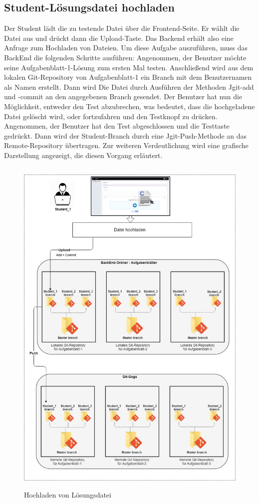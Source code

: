 \documentclass[a4paper,12pt,oneside]{book}
\begin{document}
\subsection{Student-Lösungsdatei hochladen}
Der Student lädt die zu testende Datei über die Frontend-Seite. Er wählt die Datei aus und drückt dann die Upload-Taste. Das Backend erhält also eine Anfrage zum Hochladen von Dateien. Um diese Aufgabe auszuführen, muss das BackEnd die folgenden Schritte ausführen: Angenommen, der Benutzer möchte seine Aufgabenblatt-1-Lösung zum ersten Mal testen. Anschließend wird aus dem lokalen Git-Repository von Aufgabenblatt-1 ein Branch mit dem Benutzernamen als Namen erstellt. Dann wird Die Datei durch Ausführen der Methoden Jgit-add und -commit an den angegebenen Branch gesendet. Der Benutzer hat nun die Möglichkeit, entweder den Test abzubrechen, was bedeutet, dass die hochgeladene Datei gelöscht wird, oder fortzufahren und den Testknopf zu drücken. Angenommen, der Benutzer hat den Test abgeschlossen und die Testtaste gedrückt. Dann wird der Student-Branch durch eine Jgit-Push-Methode an das Remote-Repository übertragen. Zur weiteren Verdeutlichung wird eine grafische Darstellung angezeigt, die diesen Vorgang erläutert.
\begin{figure}[h!]
	\begin{center}
		\includegraphics[width=14cm, height=17cm]{Loesungupload.jpg}
		\caption{Hochladen von Lösungsdatei} 
		\label{ Hochladen von Lösungsdatei } 
	\end{center}
\end{figure}
\end{document}
